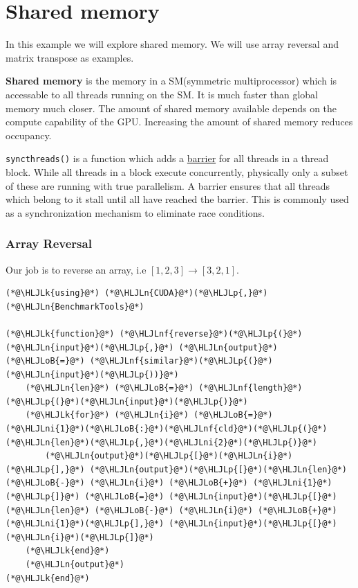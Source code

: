 \documentclass[12pt,a4paper]{article}
\newcommand{\HLJLk}[1]{\textcolor[RGB]{148,91,176}{\textbf{#1}}}
\newcommand{\HLJLn}[1]{#1}
\newcommand{\HLJLnf}[1]{\textcolor[RGB]{66,102,213}{#1}}
\newcommand{\HLJLni}[1]{\textcolor[RGB]{59,151,46}{#1}}
\newcommand{\HLJLoB}[1]{\textcolor[RGB]{102,102,102}{\textbf{#1}}}
\newcommand{\HLJLp}[1]{#1}
\begin{document}
\section{Shared memory}
In this example we will explore shared memory. We will use array reversal and matrix transpose as examples.

\textbf{Shared memory} is the memory in a SM(symmetric multiprocessor) which is accessable to all threads running on the SM. It is much faster than global memory much closer. The amount of shared memory available depends on the compute capability of the GPU. Increasing the amount of shared memory reduces occupancy.

\texttt{syncthreads()} is a function which adds a \href{https://en.wikipedia.org/wiki/Barrier_(computer_science)}{barrier} for all threads in a thread block. While all threads in a block execute concurrently, physically only a subset of these are running with true parallelism. A barrier ensures that all threads which belong to it stall until all have reached the barrier. This is commonly used as a synchronization mechanism to eliminate race conditions.

\subsubsection{Array Reversal}
Our job is to reverse an array, i.e $[1, 2, 3] \rightarrow [3, 2, 1]$.


\begin{lstlisting}
(*@\HLJLk{using}@*) (*@\HLJLn{CUDA}@*)(*@\HLJLp{,}@*) (*@\HLJLn{BenchmarkTools}@*)

(*@\HLJLk{function}@*) (*@\HLJLnf{reverse}@*)(*@\HLJLp{(}@*)(*@\HLJLn{input}@*)(*@\HLJLp{,}@*) (*@\HLJLn{output}@*) (*@\HLJLoB{=}@*) (*@\HLJLnf{similar}@*)(*@\HLJLp{(}@*)(*@\HLJLn{input}@*)(*@\HLJLp{))}@*)
    (*@\HLJLn{len}@*) (*@\HLJLoB{=}@*) (*@\HLJLnf{length}@*)(*@\HLJLp{(}@*)(*@\HLJLn{input}@*)(*@\HLJLp{)}@*)
    (*@\HLJLk{for}@*) (*@\HLJLn{i}@*) (*@\HLJLoB{=}@*) (*@\HLJLni{1}@*)(*@\HLJLoB{:}@*)(*@\HLJLnf{cld}@*)(*@\HLJLp{(}@*)(*@\HLJLn{len}@*)(*@\HLJLp{,}@*)(*@\HLJLni{2}@*)(*@\HLJLp{)}@*)
        (*@\HLJLn{output}@*)(*@\HLJLp{[}@*)(*@\HLJLn{i}@*)(*@\HLJLp{],}@*) (*@\HLJLn{output}@*)(*@\HLJLp{[}@*)(*@\HLJLn{len}@*) (*@\HLJLoB{-}@*) (*@\HLJLn{i}@*) (*@\HLJLoB{+}@*) (*@\HLJLni{1}@*)(*@\HLJLp{]}@*) (*@\HLJLoB{=}@*) (*@\HLJLn{input}@*)(*@\HLJLp{[}@*)(*@\HLJLn{len}@*) (*@\HLJLoB{-}@*) (*@\HLJLn{i}@*) (*@\HLJLoB{+}@*) (*@\HLJLni{1}@*)(*@\HLJLp{],}@*) (*@\HLJLn{input}@*)(*@\HLJLp{[}@*)(*@\HLJLn{i}@*)(*@\HLJLp{]}@*)
    (*@\HLJLk{end}@*)
    (*@\HLJLn{output}@*)
(*@\HLJLk{end}@*)
\end{lstlisting}
\end{document}
